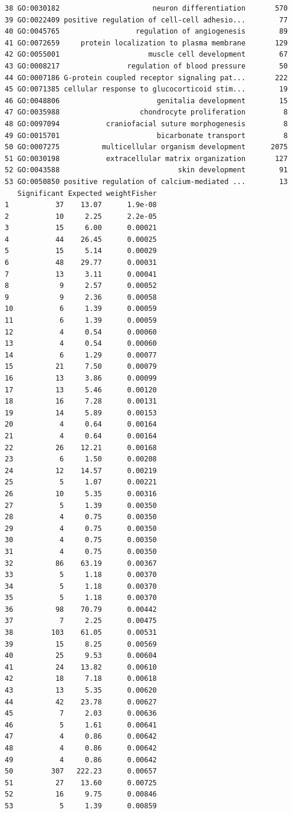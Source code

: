\documentclass[]{article}
\begin{document}
\begin{verbatim}
38 GO:0030182                      neuron differentiation       570
39 GO:0022409 positive regulation of cell-cell adhesio...        77
40 GO:0045765                  regulation of angiogenesis        89
41 GO:0072659     protein localization to plasma membrane       129
42 GO:0055001                     muscle cell development        67
43 GO:0008217                regulation of blood pressure        50
44 GO:0007186 G-protein coupled receptor signaling pat...       222
45 GO:0071385 cellular response to glucocorticoid stim...        19
46 GO:0048806                       genitalia development        15
47 GO:0035988                   chondrocyte proliferation         8
48 GO:0097094           craniofacial suture morphogenesis         8
49 GO:0015701                       bicarbonate transport         8
50 GO:0007275          multicellular organism development      2075
51 GO:0030198           extracellular matrix organization       127
52 GO:0043588                            skin development        91
53 GO:0050850 positive regulation of calcium-mediated ...        13
   Significant Expected weightFisher
1           37    13.07      1.9e-08
2           10     2.25      2.2e-05
3           15     6.00      0.00021
4           44    26.45      0.00025
5           15     5.14      0.00029
6           48    29.77      0.00031
7           13     3.11      0.00041
8            9     2.57      0.00052
9            9     2.36      0.00058
10           6     1.39      0.00059
11           6     1.39      0.00059
12           4     0.54      0.00060
13           4     0.54      0.00060
14           6     1.29      0.00077
15          21     7.50      0.00079
16          13     3.86      0.00099
17          13     5.46      0.00120
18          16     7.28      0.00131
19          14     5.89      0.00153
20           4     0.64      0.00164
21           4     0.64      0.00164
22          26    12.21      0.00168
23           6     1.50      0.00208
24          12    14.57      0.00219
25           5     1.07      0.00221
26          10     5.35      0.00316
27           5     1.39      0.00350
28           4     0.75      0.00350
29           4     0.75      0.00350
30           4     0.75      0.00350
31           4     0.75      0.00350
32          86    63.19      0.00367
33           5     1.18      0.00370
34           5     1.18      0.00370
35           5     1.18      0.00370
36          98    70.79      0.00442
37           7     2.25      0.00475
38         103    61.05      0.00531
39          15     8.25      0.00569
40          25     9.53      0.00604
41          24    13.82      0.00610
42          18     7.18      0.00618
43          13     5.35      0.00620
44          42    23.78      0.00627
45           7     2.03      0.00636
46           5     1.61      0.00641
47           4     0.86      0.00642
48           4     0.86      0.00642
49           4     0.86      0.00642
50         307   222.23      0.00657
51          27    13.60      0.00725
52          16     9.75      0.00846
53           5     1.39      0.00859
\end{verbatim}
\end{document}
